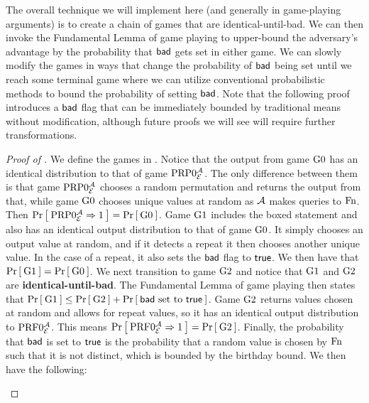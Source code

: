 The overall technique we will implement here (and generally in game-playing arguments) is to create a chain of games that are identical-until-bad. We can then invoke the Fundamental Lemma of game playing to upper-bound the adversary's advantage by the probability that $\mathsf{bad}$ gets set in either game. We can slowly modify the games in ways that change the probability of $\mathsf{bad}$ being set until we reach some terminal game where we can utilize conventional probabilistic methods to bound the probability of setting $\mathsf{bad}$. Note that the following proof introduces a $\mathsf{bad}$ flag that can be immediately bounded by traditional means without modification, although future proofs we will see will require further transformations. 

\begin{proof}[Proof of ]
	 We define the games in . Notice that the output from game ${{\textnormal G}}0$ has an identical distribution to that of game $\textnormal{PRP}0_{\cal E}^{\mathcal A}$. The only difference between them is that game $\textnormal{PRP}0_{\cal E}^{\mathcal A}$ chooses a random permutation and returns the output from that, while game ${{\textnormal G}}0$ chooses unique values at random as ${\mathcal A}$ makes queries to $\textnormal{Fn}$. Then $\Pr\left[\: \textnormal{PRP}0_{\cal E}^{\mathcal A}\Rightarrow1 \:\right] = \Pr\left[\: {{\textnormal G}}0 \:\right]$. Game ${{\textnormal G}}1$ includes the boxed statement and also has an identical output distribution to that of game ${{\textnormal G}}0$. It simply chooses an output value at random, and if it detects a repeat it then chooses another unique value. In the case of a repeat, it also sets the $\mathsf{bad}$ flag to $\mathsf{true}$. We then have that $\Pr\left[\: {{\textnormal G}}1 \:\right] = \Pr\left[\: {{\textnormal G}}0 \:\right]$. We next transition to game ${{\textnormal G}}2$ and notice that ${{\textnormal G}}1$ and ${{\textnormal G}}2$ are \textbf{identical-until-bad}. The Fundamental Lemma of game playing then states that $\Pr\left[\: {{\textnormal G}}1 \:\right] \leq \Pr\left[\: {{\textnormal G}}2 \:\right] + \Pr\left[\: \mathsf{bad} \text{ set to } \mathsf{true} \:\right]$. Game ${{\textnormal G}}2$ returns values chosen at random and allows for repeat values, so it has an identical output distribution to $\textnormal{PRF}0_{\cal E}^{\mathcal A}$. This means $\Pr\left[\: \textnormal{PRF}0_{\cal E}^{\mathcal A}\Rightarrow1 \:\right] = \Pr\left[\: {{\textnormal G}}2 \:\right]$. Finally, the probability that $\mathsf{bad}$ is set to $\mathsf{true}$ is the probability that a random value is chosen by $\textnormal{Fn}$ such that it is not distinct, which is bounded by the birthday bound. We then have the following:
	 
	 \begin{figure}
	 	\centering
\end{figure}
\end{proof}
